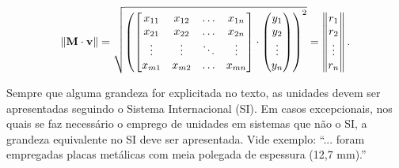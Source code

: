 \begin{equation}\label{eq:matrix}
	\Vert \vb{M}\cdot\vb{v}\Vert = \sqrt{ \left(
	\begin{bmatrix}
		x_{11}  & x_{12} & \dots	& x_{1n} \\
		x_{21}  & x_{22} & \dots	& x_{2n} \\
		\vdots	& \vdots & \ddots	& \vdots \\
		x_{m1}	& x_{m2} & \dots	& x_{mn}
	\end{bmatrix}
	\cdot
	\begin{pmatrix}
		y_{1} \\
		y_{2} \\
		\vdots\\
		y_{n}	
	\end{pmatrix} \right)^2}
	=
	\begin{Vmatrix}
		r_{1} \\
		r_{2} \\
		\vdots\\
		r_{n}	
	\end{Vmatrix}.
\end{equation}

Sempre que alguma grandeza for explicitada no texto, as unidades devem ser apresentadas seguindo o Sistema Internacional (SI). Em casos excepcionais, nos quais se faz necessário o emprego de unidades em sistemas que não o SI, a grandeza equivalente no SI deve ser apresentada. Vide exemplo: ``... foram empregadas placas metálicas com meia polegada de espessura (12,7 mm).''